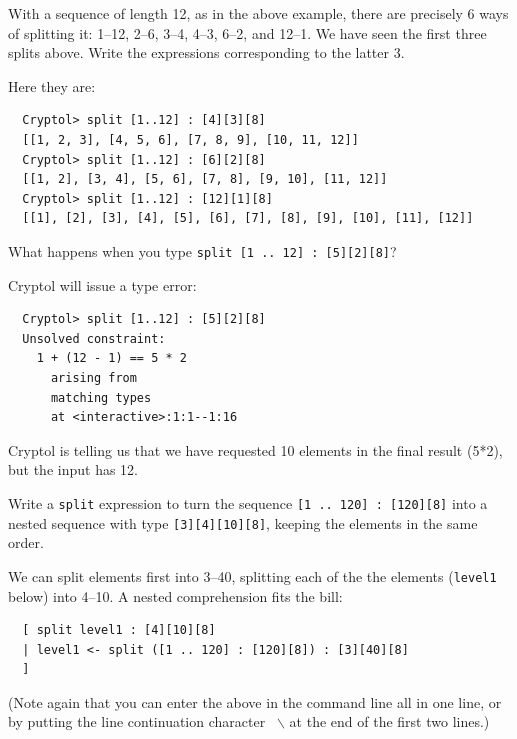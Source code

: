 \begin{Exercise}\label{ex:split:0}
  With a sequence of length 12, as in the above example, there are
  precisely 6 ways of splitting it: 1--12, 2--6, 3--4, 4--3, 6--2, and
  12--1. We have seen the first three splits above. Write the
  expressions corresponding to the latter 3.\indSplit
\end{Exercise}
\begin{Answer}
Here they are:\indSplit
\begin{Verbatim}
  Cryptol> split [1..12] : [4][3][8]
  [[1, 2, 3], [4, 5, 6], [7, 8, 9], [10, 11, 12]]
  Cryptol> split [1..12] : [6][2][8]
  [[1, 2], [3, 4], [5, 6], [7, 8], [9, 10], [11, 12]]
  Cryptol> split [1..12] : [12][1][8]
  [[1], [2], [3], [4], [5], [6], [7], [8], [9], [10], [11], [12]]
\end{Verbatim}
\end{Answer}

\begin{Exercise}\label{ex:split:1}
  What happens when you type {\tt split [1 .. 12] :
    [5][2][8]}?\indSplit
\end{Exercise}
\begin{Answer}
Cryptol will issue a type error:\indSplit
\begin{Verbatim}
  Cryptol> split [1..12] : [5][2][8]
  Unsolved constraint:
    1 + (12 - 1) == 5 * 2
      arising from
      matching types
      at <interactive>:1:1--1:16
\end{Verbatim}
Cryptol is telling us that we have requested 10 elements in the final
result (5*2), but the input has 12.
\end{Answer}

\begin{Exercise}\label{ex:split:2}
  Write a {\tt split} expression to turn the sequence {\tt [1 .. 120]
    : [120][8]} into a nested sequence with type {\tt [3][4][10][8]},
  keeping the elements in the same order.\indSplit {}  \indComp
\end{Exercise}
\begin{Answer}
  We can split elements first into 3--40, splitting each
  of the the elements ({\tt level1} below) into 4--10. A nested
  comprehension fits the bill:\indComp
\begin{Verbatim}
  [ split level1 : [4][10][8]
  | level1 <- split ([1 .. 120] : [120][8]) : [3][40][8]
  ]
\end{Verbatim}
(Note again that you can enter the above in the command line all in
one line, or by putting the line continuation character {\tt
  $\backslash$} at the end of the first two lines.)\indLineCont
\end{Answer}

